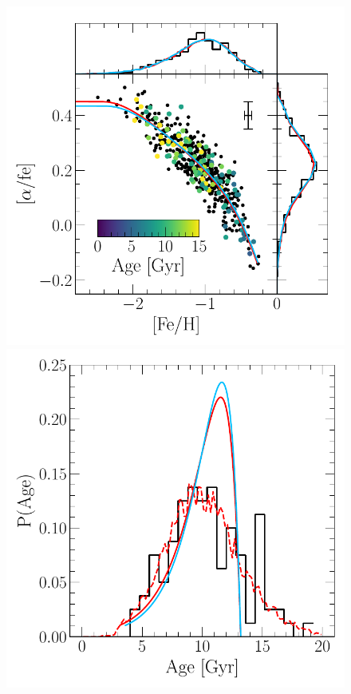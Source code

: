 \documentclass[ms.tex]{subfiles}
\begin{document}
\begin{figure}
\centering
\includegraphics[scale = 0.5]{fiducial_mock_afe_feh.pdf}
\includegraphics[scale = 0.42]{fiducial_mock_agedist.pdf}

\end{figure}
\end{document}
